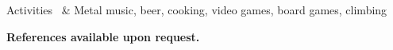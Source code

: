 \documentclass{cv}
\newcommand{\activite}[1]{\textbf{#1}\ }
\newcommand{\comment}[1]{{#1}\ }
\newcommand{\hs}{\hspace{1.6em}}
\begin{document}
\begin{rubriquetableau}[2.5cm]{Activities}
~& Metal music, beer, cooking, video games, board games, climbing
\end{rubriquetableau}

\begin{center}
        \vspace{0.5em}
    \textbf{References available upon request.}
\end{center}
\end{document}
